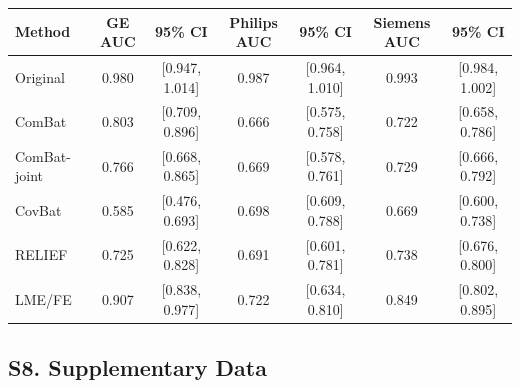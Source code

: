 \documentclass[12pt,a4paper]{article}
\begin{document}
\vspace{4mm}
\begin{table}[H]
\centering
\footnotesize
\setlength{\tabcolsep}{3pt}
\begin{tabular}{lcccccc}
\toprule
\textbf{Method} & \textbf{GE AUC} & \textbf{95\% CI} & \textbf{Philips AUC} & \textbf{95\% CI} & \textbf{Siemens AUC} & \textbf{95\% CI} \\
\midrule
Original      & 0.980 & [0.947, 1.014] & 0.987 & [0.964, 1.010] & 0.993 & [0.984, 1.002] \\
ComBat        & 0.803 & [0.709, 0.896] & 0.666 & [0.575, 0.758] & 0.722 & [0.658, 0.786] \\
ComBat-joint  & 0.766 & [0.668, 0.865] & 0.669 & [0.578, 0.761] & 0.729 & [0.666, 0.792] \\
CovBat        & 0.585 & [0.476, 0.693] & 0.698 & [0.609, 0.788] & 0.669 & [0.600, 0.738] \\
RELIEF        & 0.725 & [0.622, 0.828] & 0.691 & [0.601, 0.781] & 0.738 & [0.676, 0.800] \\
LME/FE        & 0.907 & [0.838, 0.977] & 0.722 & [0.634, 0.810] & 0.849 & [0.802, 0.895] \\
\bottomrule
\end{tabular}
\end{table}

\subsection*{S8. Supplementary Data}
\end{document}
